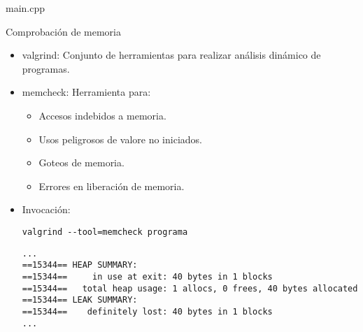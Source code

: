 
\begin{frame}
\begin{block}{main.cpp}

\end{block}
\end{frame}

\begin{frame}[fragile]{Comprobación de memoria}
\begin{itemize}
  \item \alert{valgrind}: Conjunto de herramientas para realizar análisis dinámico de programas.
  \item \alert{memcheck}: Herramienta para:
    \begin{itemize}
      \item Accesos indebidos a memoria.
      \item Usos peligrosos de valore no iniciados.
      \item Goteos de memoria.
      \item Errores en liberación de memoria.
    \end{itemize}
  \item Invocación:
\begin{lstlisting}[style=terminal]
valgrind --tool=memcheck programa
\end{lstlisting}
\begin{lstlisting}[style=terminal]
...
==15344== HEAP SUMMARY:
==15344==     in use at exit: 40 bytes in 1 blocks
==15344==   total heap usage: 1 allocs, 0 frees, 40 bytes allocated
==15344== LEAK SUMMARY:
==15344==    definitely lost: 40 bytes in 1 blocks
...
\end{lstlisting}
\end{itemize}
\end{frame}
